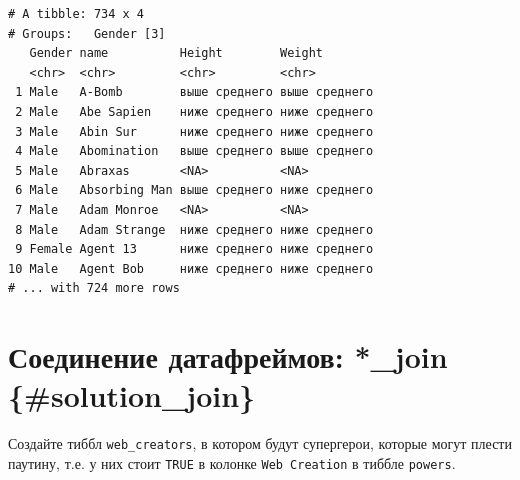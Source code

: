 \documentclass[
]{book}
\newenvironment{Shaded}{\begin{snugshade}}{\end{snugshade}}
\newcommand{\DataTypeTok}[1]{\textcolor[rgb]{0.13,0.29,0.53}{#1}}
\newcommand{\KeywordTok}[1]{\textcolor[rgb]{0.13,0.29,0.53}{\textbf{#1}}}
\newcommand{\NormalTok}[1]{#1}
\newcommand{\OperatorTok}[1]{\textcolor[rgb]{0.81,0.36,0.00}{\textbf{#1}}}
\newcommand{\StringTok}[1]{\textcolor[rgb]{0.31,0.60,0.02}{#1}}
\begin{document}
\begin{Shaded}
\end{Shaded}

\begin{verbatim}
# A tibble: 734 x 4
# Groups:   Gender [3]
   Gender name          Height        Weight       
   <chr>  <chr>         <chr>         <chr>        
 1 Male   A-Bomb        выше среднего выше среднего
 2 Male   Abe Sapien    ниже среднего ниже среднего
 3 Male   Abin Sur      ниже среднего ниже среднего
 4 Male   Abomination   выше среднего выше среднего
 5 Male   Abraxas       <NA>          <NA>         
 6 Male   Absorbing Man выше среднего ниже среднего
 7 Male   Adam Monroe   <NA>          <NA>         
 8 Male   Adam Strange  ниже среднего ниже среднего
 9 Female Agent 13      ниже среднего ниже среднего
10 Male   Agent Bob     ниже среднего ниже среднего
# ... with 724 more rows
\end{verbatim}

\hypertarget{ux441ux43eux435ux434ux438ux43dux435ux43dux438ux435-ux434ux430ux442ux430ux444ux440ux435ux439ux43cux43eux432-_join-solution_join}{%
\section{Соединение датафреймов: *\_join \{\#solution\_join\}}\label{ux441ux43eux435ux434ux438ux43dux435ux43dux438ux435-ux434ux430ux442ux430ux444ux440ux435ux439ux43cux43eux432-_join-solution_join}}

Создайте тиббл \texttt{web\_creators}, в котором будут супергерои, которые могут плести паутину, т.е. у них стоит \texttt{TRUE} в колонке \texttt{Web\ Creation} в тиббле \texttt{powers}.

\begin{Shaded}
\end{Shaded}
\end{document}

